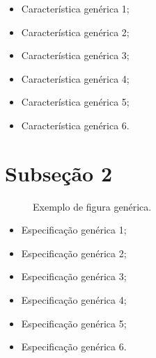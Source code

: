\documentclass[12pt,report]{uftpibic}
\begin{document}
\lipsum[9-11]

\begin{itemize}
\item Característica genérica 1;
\item Característica genérica 2;
\item Característica genérica 3;
\item Característica genérica 4;
\item Característica genérica 5;
\item Característica genérica 6.
\end{itemize}

\lipsum[12]

\section{Subseção 2}

\lipsum[13-15]

\begin{figure}[!h]
\centering
{}
\caption{Exemplo de figura genérica.}
\label{fig:generico}
\end{figure}

\lipsum[16]

\begin{itemize}
\item Especificação genérica 1;
\item Especificação genérica 2;
\item Especificação genérica 3;
\item Especificação genérica 4;
\item Especificação genérica 5;
\item Especificação genérica 6.
\end{itemize}

\lipsum[17]






\end{document}
